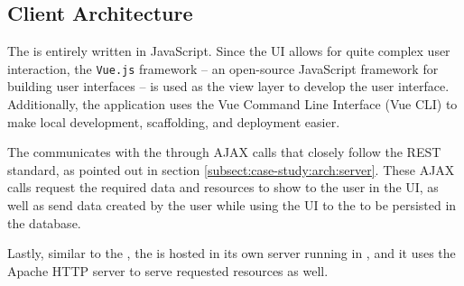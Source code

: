 \subsection{Client Architecture} \label{subsect:case-study:arch:client}

The \mlblinkui is entirely written in JavaScript. Since the UI allows for quite complex user interaction, the \texttt{Vue.js} framework \cite{software:vue} -- an open-source JavaScript framework for building user interfaces -- is used as the view layer to develop the user interface. Additionally, the application uses the Vue Command Line Interface (Vue CLI) to make local development, scaffolding, and deployment easier.

The \mlblinkui communicates with the \mlblinkapi through AJAX calls that closely follow the REST standard, as pointed out in section \ref{subsect:case-study:arch:server}. These AJAX calls request the required data and resources to show to the user in the UI, as well as send data created by the user while using the UI to the \mlblinkapi to be persisted in the database.

Lastly, similar to the \mlblinkapi, the \mlblinkui is hosted in its own server running in \ubuntu, and it uses the Apache HTTP server to serve requested resources as well.